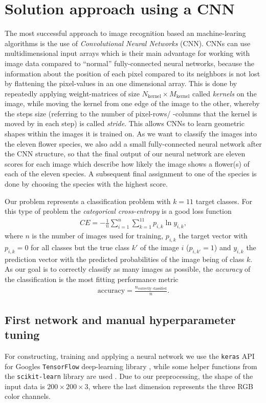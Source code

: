 \section{Solution approach using a CNN}
\label{sec:ansatz}
The most successful approach to image recognition based an machine-learing algorithms is the use of \textit{Convolutional Neural Networks} (CNN).
CNNs can use multidimensional input arrays which is their main advantage for working with image data compared to \enquote{normal} fully-connected neural networks, 
because the information about the position of each pixel compared to its neighbors is not lost by flattening the pixel-values in an one dimensional array.
This is done by repeatedly applying weight-matrices of size $N_\text{kernel}\times M_\text{kernel}$ called \textit{kernels} on the image, while moving the kernel from one edge of the image to the other, 
whereby the steps size (referring to the number of pixel-rows/ -columns that the kernel is moved by in each step) is called \textit{stride}.
This allows CNNs to learn geometric shapes within the images it is trained on.
As we want to classify the images into the eleven flower species, we also add a small fully-connected neural network after the CNN structure, so that the final output of our
neural network are eleven scores for each image which describe how likely the image shows a flower(s) of each of the eleven species.
A subsequent final assignment to one of the species is done by choosing the species with the highest score.

Our problem represents a classification problem with $k = 11$ target classes.
For this type of problem the \textit{categorical cross-entropy} is a good loss function
\begin{align}
    CE = -\frac{1}{n} \sum_{i=1}^n \sum_{k=1}^{11} p_{i,k} \ln{y_{i,k}},
\end{align}
where $n$ is the number of images used for training, $p_{i,k}$ the target vector with $p_{i,k} = 0$ for all classes but the true class $k'$ of the image $i$ ($p_{i,k'} = 1$) and 
$y_{i,k}$ the prediction vector with the predicted probabilities of the image being of class $k$.
As our goal is to correctly classify as many images as possible, the \textit{accuracy} of the classification is the most fitting performance metric
\begin{align}
    \text{accuracy} = \frac{n_\text{correctly classified}}{n}.
\end{align}


\subsection{First network and manual hyperparameter tuning}
For constructing, training and applying a neural network we use the \texttt{keras} API for Googles \texttt{TensorFlow} deep-learning library \cite{keras}, 
while some helper functions from the \texttt{scikit-learn} library are used \cite{scikit-learn}.
Due to our preprocessing, the shape of the input data is $200\times 200\times 3$, where the last dimension represents the three RGB color channels.

